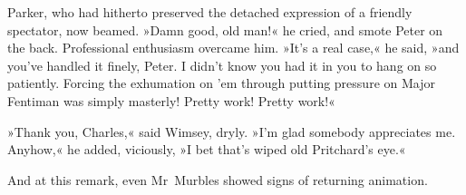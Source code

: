Parker, who had hitherto preserved the detached expression of a friendly spectator, now beamed. »Damn good, old man!« he cried, and smote Peter on the back. Professional enthusiasm overcame him. »It's a real case,« he said, »and you've handled it finely, Peter. I didn't know you had it in you to hang on so patiently. Forcing the exhumation on 'em through putting pressure on Major Fentiman was simply masterly! Pretty work! Pretty work!«

»Thank you, Charles,« said Wimsey, dryly. »I'm glad somebody appreciates me. Anyhow,« he added, viciously, »I bet that's wiped old Pritchard's eye.«

And at this remark, even Mr~Murbles showed signs of returning animation.